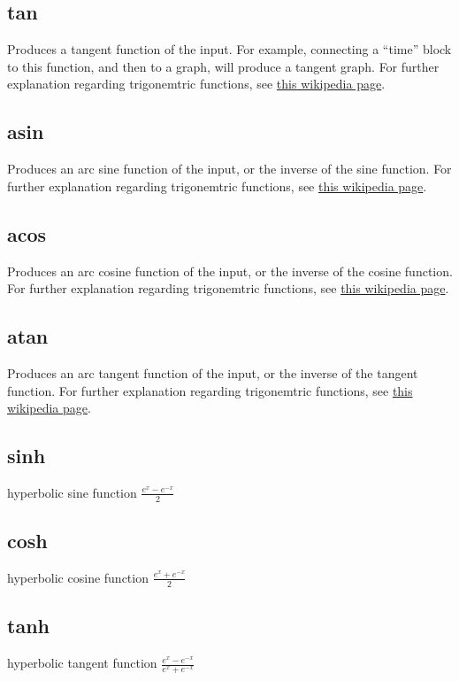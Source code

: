 \subsection{tan}\label{Operation:tan} Produces a tangent function of the input. For example, 
connecting a ``time'' block to this function, and then to a graph, will produce a tangent graph.
For further explanation regarding trigonemtric functions, 
see \href{https://en.wikipedia.org/wiki/Trigonometric_functions}{this wikipedia page}.

\subsection{asin}\label{Operation:asin} Produces an arc sine function of the input, 
or the inverse of the sine function. For further explanation regarding trigonemtric functions, 
see \href{https://en.wikipedia.org/wiki/Trigonometric_functions}{this wikipedia page}.

\subsection{acos}\label{Operation:acos} Produces an arc cosine function of the input, 
or the inverse of the cosine function. For further explanation regarding trigonemtric functions, 
see \href{https://en.wikipedia.org/wiki/Trigonometric_functions}{this wikipedia page}.

\subsection{atan}\label{Operation:atan} Produces an arc tangent function of the input, 
or the inverse of the tangent function. For further explanation regarding trigonemtric functions, 
see \href{https://en.wikipedia.org/wiki/Trigonometric_functions}{this wikipedia page}.

\subsection{sinh}\label{Operation:sinh} hyperbolic sine function $\frac{e^x-e^{-x}}2$
\subsection{cosh}\label{Operation:cosh} hyperbolic cosine function $\frac{e^x+e^{-x}}2$
\subsection{tanh}\label{Operation:tanh} hyperbolic tangent function $\frac{e^x-e^{-x}}{e^x+e^{-x}}$

